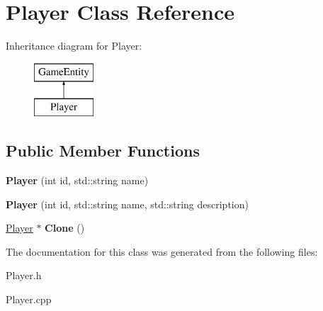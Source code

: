 \hypertarget{class_player}{}\section{Player Class Reference}
\label{class_player}
Inheritance diagram for Player\+:\begin{figure}[H]
\begin{center}
\leavevmode
\includegraphics[height=2.000000cm]{class_player}
\end{center}
\end{figure}
\subsection*{Public Member Functions}
\begin{DoxyCompactItemize}
\item 
\hypertarget{class_player_a52b1205956ebebdf8fb8ed36cb96bb38}{}{\bfseries Player} (int id, std\+::string name)\label{class_player_a52b1205956ebebdf8fb8ed36cb96bb38}

\item 
\hypertarget{class_player_aece2ef9f10fff6f075e6690c3151ca7e}{}{\bfseries Player} (int id, std\+::string name, std\+::string description)\label{class_player_aece2ef9f10fff6f075e6690c3151ca7e}

\item 
\hypertarget{class_player_af5b2efe38828c633dc18228ce427177b}{}\hyperlink{class_player}{Player} $\ast$ {\bfseries Clone} ()\label{class_player_af5b2efe38828c633dc18228ce427177b}

\end{DoxyCompactItemize}


The documentation for this class was generated from the following files\+:\begin{DoxyCompactItemize}
\item 
Player.\+h\item 
Player.\+cpp\end{DoxyCompactItemize}
